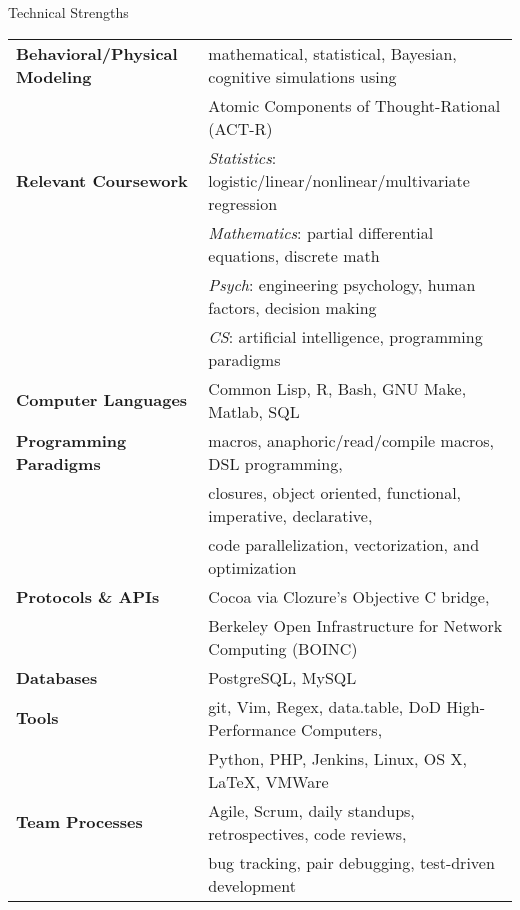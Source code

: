 

\begin{rSection}{Technical Strengths}
  \begin{tabular}{ @{} >{\bfseries}l @{\hspace{4ex}} l }
    Behavioral/Physical Modeling &	mathematical, statistical, Bayesian, cognitive simulations using \\
    &					Atomic Components of Thought-Rational (ACT-R) \\
    [.13cm]
    Relevant Coursework &		\emph{Statistics}: logistic/linear/nonlinear/multivariate regression \\
    &					\emph{Mathematics}: partial differential equations, discrete math \\
    &					\emph{Psych}: engineering psychology, human factors, decision making \\ 
    &					\emph{CS}: artificial intelligence, programming paradigms \\
    [.13cm]
    Computer Languages &		Common Lisp, R, Bash, GNU Make, Matlab, SQL \\
    [.13cm]
    Programming Paradigms &		macros, anaphoric/read/compile macros, DSL programming, \\
    & 					closures, object oriented, functional, imperative, declarative, \\
    &					code parallelization, vectorization, and optimization \\
    [.13cm]
    Protocols \& APIs & 		Cocoa via Clozure's Objective C bridge, \\
    &					Berkeley Open Infrastructure for Network Computing (BOINC) \\
    [.13cm]
    Databases &				PostgreSQL, MySQL \\
    [.13cm]
    Tools & 				git, Vim, Regex, data.table, DoD High-Performance Computers, \\
    &					Python, PHP, Jenkins, Linux, OS X, \LaTeX, VMWare\\
    [.13cm]
    Team Processes & 			Agile, Scrum, daily standups, retrospectives, code reviews, \\
    & 					bug tracking, pair debugging, test-driven development \\
  \end{tabular}
\end{rSection}


